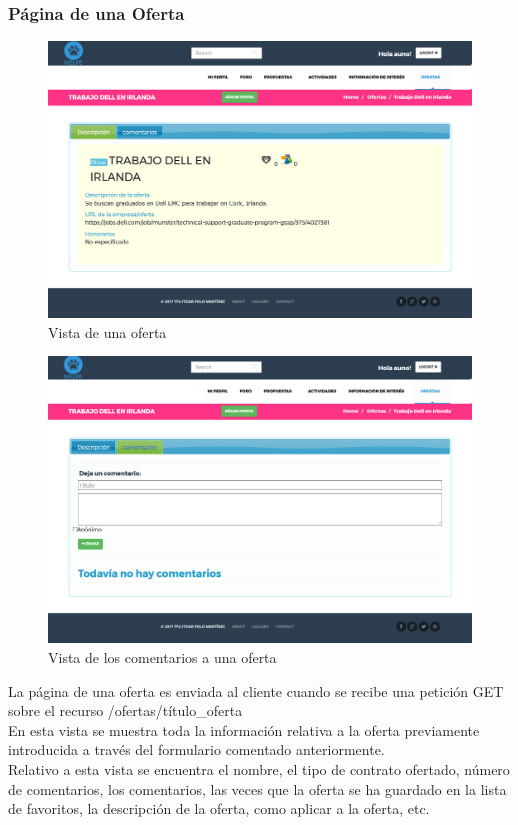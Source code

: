 \subsubsection{Página de una Oferta}
\label{subsubsec:oferta}
\begin{figure}[H]
\centering
\includegraphics[width=12cm]{img/oferta}
\caption{Vista de una oferta}
\label{figura:oferta}
\end{figure}
\begin{figure}[H]
\centering
\includegraphics[width=12cm]{img/oferta_comment}
\caption{Vista de los comentarios a una oferta}
\label{figura:oferta_comment}
\end{figure}
La página de una oferta es enviada al cliente cuando se recibe una petición GET sobre el recurso /ofertas/{título\_oferta}\\
En esta vista se muestra toda la información relativa a la oferta previamente introducida a través del formulario comentado anteriormente. \\
Relativo a esta vista se encuentra el nombre, el tipo de contrato ofertado, número de comentarios, los comentarios, las veces que la oferta se ha guardado en la lista de favoritos, la descripción de la oferta, como aplicar a la oferta, etc.\\
